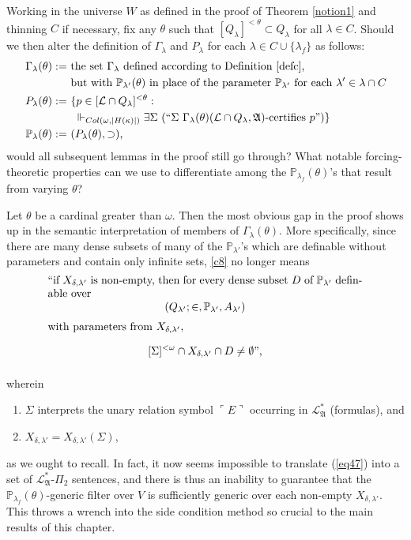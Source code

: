 \documentclass[12pt, twoside]{memoir}
\numberwithin{equation}{section}
\theoremstyle{definition}
\theoremstyle{remark}
\theoremstyle{definition}
\theoremstyle{definition}
\theoremstyle{definition}
\theoremstyle{remark}
\begin{document}
Working in the universe $W$ as defined in the proof of Theorem \ref{notion1} and thinning $C$ if necessary, fix any $\theta$ such that $[Q_{\lambda}]^{< \theta} \subset Q_{\lambda}$ for all $\lambda \in C$. Should we then alter the definition of $\Gamma_{\lambda}$ and $P_{\lambda}$ for each $\lambda \in C \cup \{\lambda_f\}$ as follows:
\begin{align*}
    \Gamma_{\lambda}(\theta) := \ & \text{the set } \Gamma_{\lambda} \text{ defined according to Definition \ref{defc},} \\
    & \text{but with } \mathbb{P}_{\lambda'}(\theta) \text{ in place of the parameter } \mathbb{P}_{\lambda'} \text{ for each } \lambda' \in \lambda \cap C \\
    P_{\lambda}(\theta) := \ & \{p \in [\mathcal{L} \cap Q_{\lambda}]^{< \theta} : \\
    & \ \Vdash_{Col(\omega, |H(\kappa)|)} \exists \Sigma \ (``\Sigma \ \Gamma_{\lambda}(\theta) (\mathcal{L} \cap Q_{\lambda}, \mathfrak{A}) \text{-certifies } p")\} \\
    \mathbb{P}_{\lambda}(\theta) := \ & (P_{\lambda}(\theta), \supset) \text{,}
\end{align*}
would all subsequent lemmas in the proof still go through? What notable forcing-theoretic properties can we use to differentiate among the $\mathbb{P}_{\lambda_f}(\theta)$'s that result from varying $\theta$? 

Let $\theta$ be a cardinal greater than $\omega$. Then the most obvious gap in the proof shows up in the semantic interpretation of members of $\Gamma_{\lambda}(\theta)$. More specifically, since there are many dense subsets of many of the $\mathbb{P}_{\lambda'}$'s which are definable without parameters and contain only infinite sets, \ref{c8} no longer means
\begin{equation}
    \label{eq47}
    \parbox{\dimexpr\linewidth-6em}{
        ``if $X_{\delta, \lambda'}$ is non-empty, then for every dense subset $D$ of $\mathbb{P}_{\lambda'}$ definable over $$(Q_{\lambda'}; \in, \mathbb{P}_{\lambda'}, A_{\lambda'})$$ with parameters from $X_{\delta, \lambda'}$, $$[\Sigma]^{< \omega} \cap X_{\delta, \lambda'} \cap D \neq \emptyset \text{'',}$$ 
    }
\end{equation}
wherein 
\begin{enumerate}[label=(\alph*)]
    \item $\Sigma$ interprets the unary relation symbol $\ulcorner E \urcorner$ occurring in $\mathcal{L}^*_{\mathfrak{A}}$ (formulas), and
    \item $X_{\delta, \lambda'} = X_{\delta, \lambda'}(\Sigma)$,
\end{enumerate}
as we ought to recall. In fact, it now seems impossible to translate (\ref{eq47}) into a set of $\mathcal{L}^*_{\mathfrak{A}}$-$\Pi_2$ sentences, and there is thus an inability to guarantee that the $\mathbb{P}_{\lambda_f}(\theta)$-generic filter over $V$ is sufficiently generic over each non-empty $X_{\delta, \lambda'}$. This throws a wrench into the side condition method so crucial to the main results of this chapter.  
\end{document}
